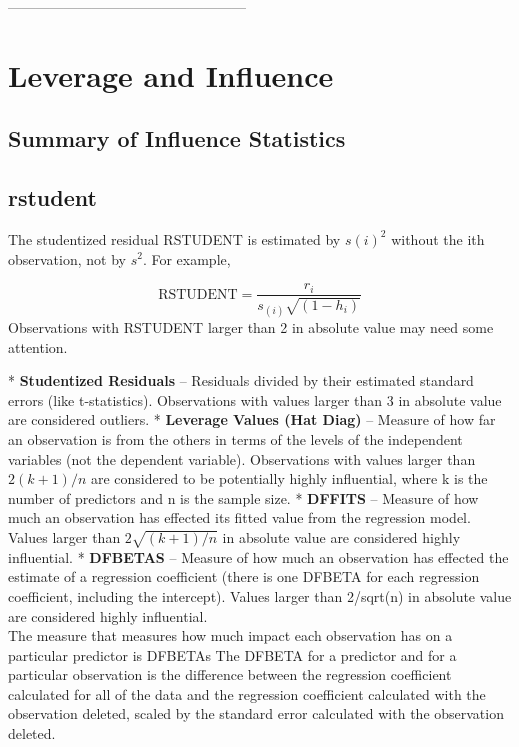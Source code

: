 




\Large

--------------------------------------------------- %
	\section{Leverage and Influence}
	
	\subsection{Summary of Influence Statistics}
	\subsection{rstudent}
	The studentized residual RSTUDENT is estimated by $s(i)^2$ without the ith observation, not by $s^2$. For example,
	
	\[\mbox{RSTUDENT} = \frac{r_i}{s_{(i)} \sqrt{(1 - h_i)}} \]
	Observations with RSTUDENT larger than 2 in absolute value may need some attention.
	
	
	
	
	
	
	*  	\textbf{Studentized Residuals} – Residuals divided by their estimated standard errors (like t-statistics). Observations with values larger than 3 in absolute value are considered outliers.
	*  	\textbf{Leverage Values (Hat Diag)} – Measure of how far an observation is from the others in terms of the levels of the independent variables (not the dependent variable). Observations with values larger than $2(k+1)/n$ are considered to be potentially highly influential, where k is the number of predictors and n is the sample size.
	*  	\textbf{DFFITS} – Measure of how much an observation has effected its fitted value from the regression model. Values larger than $2\sqrt{(k+1)/n}$ in absolute value are considered highly influential. %
	*  	\textbf{DFBETAS} – Measure of how much an observation has effected the estimate of a regression coefficient (there is one DFBETA for each regression coefficient, including the intercept). Values larger than 2/sqrt(n) in absolute value are considered highly influential.
		\\
		The measure that measures how much impact each observation has on a particular predictor is DFBETAs The DFBETA for a predictor and for a particular observation is the difference between the regression coefficient calculated for all of the data and the regression coefficient calculated with the observation deleted, scaled by the standard error calculated with the observation deleted. 
		
